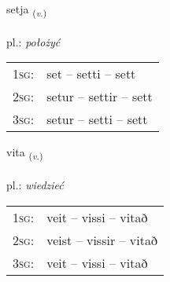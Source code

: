 \documentclass[frontgrid, backgrid]{flacards}\usepackage[]{graphicx}\usepackage[]{xcolor}
\begin{document}
\renewcommand{\flhead}{\vskip5pt \fboxsep=0pt {\small\bfseries\footnotesize Sagnorð | czasownik}}
\renewcommand{\fcfoot}{\vskip5pt \fboxsep=0pt \hspace{2pt}{\small\bfseries\footnotesize 1K}}

\renewcommand{\blhead}{\vskip5pt {\small\bfseries\footnotesize Sagnorð | czasownik }}
\renewcommand{\bcfoot}{\vskip5pt \hspace{2pt}{\small\bfseries\footnotesize 1K}}


{setja \small{\textsubscript{(\textit{v.})}} \\[1ex] %
\textphonetic{[sɛːtja]} \\
pl.: \emph{położyć} \\  [2ex]
\renewcommand*{\arraystretch}{0.8}
\begin{tabular}{p{1cm}l}
\textsc{1sg}: & set -- setti -- sett \\ 
\textsc{2sg}: & setur -- settir -- sett \\ 
\textsc{3sg}: & setur -- setti -- sett \\ 
\end{tabular}
}

\renewcommand{\flhead}{\vskip5pt \fboxsep=0pt {\small\bfseries\footnotesize Sagnorð | czasownik}}
\renewcommand{\fcfoot}{\vskip5pt \fboxsep=0pt \hspace{2pt}{\small\bfseries\footnotesize 1K}}

\renewcommand{\blhead}{\vskip5pt {\small\bfseries\footnotesize Sagnorð | czasownik }}
\renewcommand{\bcfoot}{\vskip5pt \hspace{2pt}{\small\bfseries\footnotesize 1K}}


{vita \small{\textsubscript{(\textit{v.})}} \\[1ex] %
\textphonetic{[vɪːta]} \\
pl.: \emph{wiedzieć} \\  [2ex]
\renewcommand*{\arraystretch}{0.8}
\begin{tabular}{p{1cm}l}
\textsc{1sg}: & veit -- vissi -- vitað \\ 
\textsc{2sg}: & veist -- vissir -- vitað \\ 
\textsc{3sg}: & veit -- vissi -- vitað \\ 
\end{tabular}
}
\end{document}
